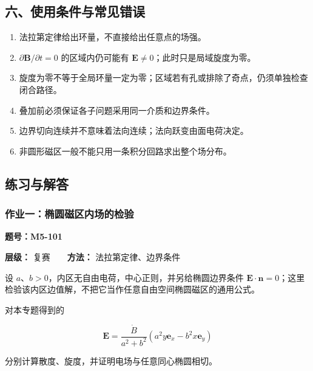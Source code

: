 \subsection{六、使用条件与常见错误}\label{m5:ux516dux4f7fux7528ux6761ux4ef6ux4e0eux5e38ux89c1ux9519ux8bef}

\begin{enumerate}
\def\labelenumi{\arabic{enumi}.}
\tightlist
\item
  法拉第定律给出环量，不直接给出任意点的场强。
\item
  \(\partial\mathbf B/\partial t=0\) 的区域内仍可能有
  \(\mathbf E\ne0\)；此时只是局域旋度为零。
\item
  旋度为零不等于全局环量一定为零；区域若有孔或排除了奇点，仍须单独检查闭合路径。
\item
  叠加前必须保证各子问题采用同一介质和边界条件。
\item
  边界切向连续并不意味着法向连续；法向跃变由面电荷决定。
\item
  非圆形磁区一般不能只用一条积分回路求出整个场分布。
\end{enumerate}

\subsection{练习与解答}\label{m5:ux7ec3ux4e60ux4e0eux89e3ux7b54-5}

\par{}
\noindent\begin{minipage}{\linewidth}

\subsubsection{作业一：椭圆磁区内场的检验}\label{m5:ux4f5cux4e1aux4e00ux692dux5706ux78c1ux533aux5185ux573aux7684ux68c0ux9a8c}

\textbf{题号：M5-101}

\textbf{层级：} 复赛　　\textbf{方法：} 法拉第定律、边界条件

设 \(a\text{、}b>0\)，内区无自由电荷，中心正则，并另给椭圆边界条件
\(\mathbf E\cdot\mathbf n=0\)；这里检验该内区边值解，不把它当作任意自由空间椭圆磁区的通用公式。

对本专题得到的

\[
\mathbf E=\frac{\dot B}{a^2+b^2}
(a^2y\mathbf e_x-b^2x\mathbf e_y)
\]

分别计算散度、旋度，并证明电场与任意同心椭圆相切。

\end{minipage}\par

